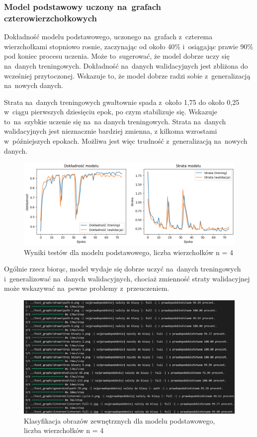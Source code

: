 \subsubsection{Model podstawowy uczony na~grafach czterowierzchołkowych}

Dokładność modelu podstawowego, uczonego na~grafach z~czterema wierzchołkami stopniowo rosnie,
zaczynając od około 40\% i~osiągając prawie 90\% pod koniec procesu uczenia.
Może to~sugerować, że model dobrze uczy się na~danych treningowych.
Dokładność na~danych walidacyjnych jest zbliżona do wcześniej przytoczonej.
Wskazuje to, że model dobrze radzi sobie z~generalizacją na~nowych danych.

Strata na~danych treningowych gwałtownie spada z~około 1,75 do około 0,25 w~ciągu pierwszych dziesięciu epok,
po czym stabilizuje się.
Wskazuje to~na~szybkie uczenie się na~na danych treningowych.
Strata na~danych walidacyjnych jest nieznacznie bardziej zmienna,
z kilkoma wzrostami w~późniejszych epokach.
Możliwa jest więc trudność z~generalizacją na~nowych danych.

\begin{figure}[ht]
	\centering
	\includegraphics[width=15.5cm]{resources/tests/images/v3/base4_img.png}
	\caption{Wyniki testów dla modelu podstawowego, liczba wierzchołków n = 4}
	\label{Fig:tests-base-1a}
\end{figure}
\FloatBarrier

Ogólnie rzecz biorąc, model wydaje się dobrze uczyć na~danych treningowych i~generalizować na~danych walidacyjnych,
chociaż zmienność straty walidacyjnej może wskazywać na~pewne problemy z~przeuczeniem.

\begin{figure}[ht]
	\centering
	\includegraphics[width=15.5cm]{resources/tests/images/v3/base4_txt.png}
	\caption{Klasyfikacja obrazów zewnętrznych dla modelu podstawowego, liczba wierzchołków n = 4}
	\label{Fig:tests-base-1b}
\end{figure}
\FloatBarrier

